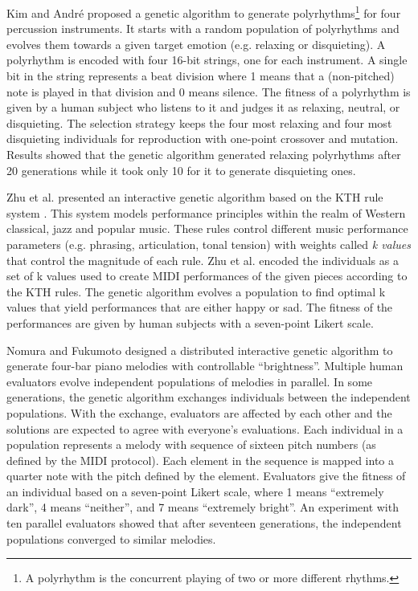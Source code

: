 Kim and Andr{\'e} \cite{kim2004composing} proposed a genetic algorithm to generate polyrhythms\footnote{A polyrhythm is the concurrent playing of two or more different rhythms.} for four percussion instruments. It starts with a random population of polyrhythms and evolves them towards a given target emotion (e.g. relaxing or disquieting). A polyrhythm is encoded with four 16-bit strings, one for each instrument. A single bit in the string represents a beat division where 1 means that a (non-pitched) note is played in that division and 0 means silence. The fitness of a polyrhythm is given by a human subject who listens to it and judges it as relaxing, neutral, or disquieting. The selection strategy keeps the four most relaxing and four most disquieting individuals for reproduction with one-point crossover and mutation. Results showed that the genetic algorithm generated relaxing polyrhythms after 20 generations while it took only
10 for it to generate disquieting ones.

Zhu et al. \cite{zhu2008emotional} presented an interactive genetic algorithm based on the KTH rule system \cite{friberg2006overview}. This system models performance principles within the realm of Western classical, jazz and popular music. These rules control different music performance parameters (e.g. phrasing, articulation, tonal tension) with weights called \textit{k values} that control the magnitude of each rule. Zhu et al. \cite{zhu2008emotional} encoded the individuals as a set of k values used to create MIDI performances of the given pieces according to the KTH rules. The genetic algorithm evolves a population to find optimal k values that yield performances that are either happy or sad. The fitness of the performances are given by human subjects with a seven-point Likert scale.

Nomura and Fukumoto \cite{nomura2018music} designed a distributed interactive genetic algorithm to generate four-bar piano melodies with controllable ``brightness''. Multiple human evaluators evolve independent populations of melodies in parallel. In some generations, the genetic algorithm exchanges individuals between the independent populations. With the exchange, evaluators are affected by each other and the solutions are expected to agree with everyone's evaluations. Each individual in a population represents a melody with sequence of sixteen pitch numbers (as defined by the MIDI protocol). Each element in the sequence is mapped into a quarter note with the pitch defined by the element. Evaluators give the fitness of an individual based on a seven-point Likert scale, where 1 means ``extremely dark'', 4 means ``neither'', and 7 means ``extremely bright''. An experiment with ten parallel evaluators showed that after seventeen generations, the independent populations converged to similar melodies.

